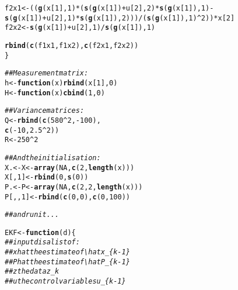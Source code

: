 \documentclass[11pt]{article}\usepackage[]{graphicx}\usepackage[]{color}
\makeatletter
\newcommand{\hlnum}[1]{\textcolor[rgb]{0.686,0.059,0.569}{#1}}%
\newcommand{\hlcom}[1]{\textcolor[rgb]{0.678,0.584,0.686}{\textit{#1}}}%
\newcommand{\hlopt}[1]{\textcolor[rgb]{0,0,0}{#1}}%
\newcommand{\hlstd}[1]{\textcolor[rgb]{0.345,0.345,0.345}{#1}}%
\newcommand{\hlkwa}[1]{\textcolor[rgb]{0.161,0.373,0.58}{\textbf{#1}}}%
\newcommand{\hlkwb}[1]{\textcolor[rgb]{0.69,0.353,0.396}{#1}}%
\newcommand{\hlkwc}[1]{\textcolor[rgb]{0.333,0.667,0.333}{#1}}%
\newcommand{\hlkwd}[1]{\textcolor[rgb]{0.737,0.353,0.396}{\textbf{#1}}}%
\newenvironment{kframe}{%
 \def\at@end@of@kframe{}%
 \ifinner\ifhmode%
  \def\at@end@of@kframe{\end{minipage}}%
  \begin{minipage}{\columnwidth}%
 \fi\fi%
 \def\FrameCommand##1{\hskip\@totalleftmargin \hskip-\fboxsep
 \colorbox{shadecolor}{##1}\hskip-\fboxsep
     \hskip-\linewidth \hskip-\@totalleftmargin \hskip\columnwidth}%
 \MakeFramed {\advance\hsize-\width
   \@totalleftmargin\z@ \linewidth\hsize
   \@setminipage}}%
 {\par\unskip\endMakeFramed%
 \at@end@of@kframe}
\newenvironment{knitrout}{}{} %
\makeatother
\begin{document}
\begin{knitrout}
\begin{kframe}
\begin{alltt}
    \hlstd{f2x1} \hlkwb{<-} \hlstd{((}\hlkwd{g}\hlstd{(x[}\hlnum{1}\hlstd{],} \hlnum{1}\hlstd{)} \hlopt{*} \hlstd{(}\hlkwd{s}\hlstd{(}\hlkwd{g}\hlstd{(x[}\hlnum{1}\hlstd{])} \hlopt{+} \hlstd{u[}\hlnum{2}\hlstd{],} \hlnum{2}\hlstd{)} \hlopt{*} \hlkwd{s}\hlstd{(}\hlkwd{g}\hlstd{(x[}\hlnum{1}\hlstd{]),} \hlnum{1}\hlstd{)} \hlopt{-} \hlkwd{s}\hlstd{(}\hlkwd{g}\hlstd{(x[}\hlnum{1}\hlstd{])} \hlopt{+} \hlstd{u[}\hlnum{2}\hlstd{],} \hlnum{1}\hlstd{)} \hlopt{*} \hlkwd{s}\hlstd{(}\hlkwd{g}\hlstd{(x[}\hlnum{1}\hlstd{]),} \hlnum{2}\hlstd{)))} \hlopt{/} \hlstd{(}\hlkwd{s}\hlstd{(}\hlkwd{g}\hlstd{(x[}\hlnum{1}\hlstd{]),} \hlnum{1}\hlstd{)}\hlopt{^}\hlnum{2}\hlstd{))} \hlopt{*} \hlstd{x[}\hlnum{2}\hlstd{]}
    \hlstd{f2x2} \hlkwb{<-} \hlkwd{s}\hlstd{(}\hlkwd{g}\hlstd{(x[}\hlnum{1}\hlstd{])} \hlopt{+} \hlstd{u[}\hlnum{2}\hlstd{],} \hlnum{1}\hlstd{)} \hlopt{/} \hlkwd{s}\hlstd{(}\hlkwd{g}\hlstd{(x[}\hlnum{1}\hlstd{]),} \hlnum{1}\hlstd{)}

    \hlkwd{rbind}\hlstd{(}\hlkwd{c}\hlstd{(f1x1, f1x2),} \hlkwd{c}\hlstd{(f2x1, f2x2))}
\hlstd{\}}

\hlcom{## Measurement matrix:}
\hlstd{h} \hlkwb{<-} \hlkwa{function}\hlstd{(}\hlkwc{x}\hlstd{)} \hlkwd{rbind}\hlstd{(x[}\hlnum{1}\hlstd{],} \hlnum{0}\hlstd{)}
\hlstd{H} \hlkwb{<-} \hlkwa{function}\hlstd{(}\hlkwc{x}\hlstd{)} \hlkwd{cbind}\hlstd{(}\hlnum{1}\hlstd{,} \hlnum{0}\hlstd{)}

\hlcom{## Variance matrices:}
\hlstd{Q} \hlkwb{<-} \hlkwd{rbind}\hlstd{(}\hlkwd{c}\hlstd{(}\hlnum{580}\hlopt{^}\hlnum{2}\hlstd{,} \hlopt{-}\hlnum{100}\hlstd{),}
           \hlkwd{c}\hlstd{(}\hlopt{-}\hlnum{10}\hlstd{,} \hlnum{2.5}\hlopt{^}\hlnum{2}\hlstd{))}
\hlstd{R} \hlkwb{<-} \hlnum{250}\hlopt{^}\hlnum{2}

\hlcom{## And the initialisation:}
\hlstd{X.} \hlkwb{<-} \hlstd{X} \hlkwb{<-} \hlkwd{array}\hlstd{(}\hlnum{NA}\hlstd{,} \hlkwd{c}\hlstd{(}\hlnum{2}\hlstd{,} \hlkwd{length}\hlstd{(x)))}
\hlstd{X[,} \hlnum{1}\hlstd{]} \hlkwb{<-} \hlkwd{rbind}\hlstd{(}\hlnum{0}\hlstd{,} \hlkwd{s}\hlstd{(}\hlnum{0}\hlstd{))}
\hlstd{P.} \hlkwb{<-} \hlstd{P} \hlkwb{<-} \hlkwd{array}\hlstd{(}\hlnum{NA}\hlstd{,} \hlkwd{c}\hlstd{(}\hlnum{2}\hlstd{,} \hlnum{2}\hlstd{,} \hlkwd{length}\hlstd{(x)))}
\hlstd{P[,,}\hlnum{1}\hlstd{]} \hlkwb{<-} \hlkwd{rbind}\hlstd{(}\hlkwd{c}\hlstd{(}\hlnum{0}\hlstd{,} \hlnum{0}\hlstd{),} \hlkwd{c}\hlstd{(}\hlnum{0}\hlstd{,} \hlnum{100}\hlstd{))}


\hlcom{## and run it ...}

\hlstd{EKF} \hlkwb{<-} \hlkwa{function}\hlstd{(}\hlkwc{d}\hlstd{) \{}
    \hlcom{## input d is a list of :}
    \hlcom{## xhat  the estimate of \textbackslash{}hat x_\{k-1\}}
    \hlcom{## Phat  the estimate of \textbackslash{}hat P_\{k-1\}}
    \hlcom{## z     the data z_k}
    \hlcom{## u     the control variables u_\{k-1\}}


\end{alltt}
\end{kframe}
\end{knitrout}
\end{document}
